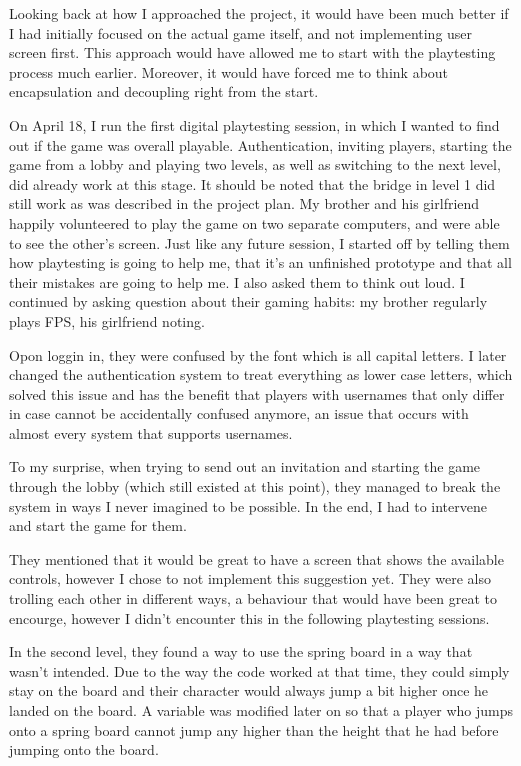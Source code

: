 \documentclass{article}
\begin{document}
Looking back at how I approached the project, it would have been much better if I had initially focused on the actual game itself, and not implementing user screen first. This approach would have allowed me to start with the playtesting process much earlier. Moreover, it would have forced me to think about encapsulation and decoupling right from the start. 

\bigskip
On April 18, I run the first digital playtesting session, in which I wanted to find out if the game was overall playable. Authentication, inviting players, starting the game from a lobby and playing two levels, as well as switching to the next level, did already work at this stage. It should be noted that the bridge in level 1 did still work as was described in the project plan. My brother and his girlfriend happily volunteered to play the game on two separate computers, and were able to see the other's screen. Just like any future session, I started off by telling them how playtesting is going to help me, that it's an unfinished prototype and that all their mistakes are going to help me. I also asked them to think out loud.
I continued by asking question about their gaming habits: my brother regularly plays FPS, his girlfriend noting. 

Opon loggin in, they were confused by the font which is all capital letters. I later changed the authentication system to treat everything as lower case letters, which solved this issue and has the benefit that players with usernames that only differ in case cannot be accidentally confused anymore, an issue that occurs with almost every system that supports usernames.

To my surprise, when trying to send out an invitation and starting the game through the lobby (which still existed at this point), they managed to break the system in ways I never imagined to be possible. In the end, I had to intervene and start the game for them.

They mentioned that it would be great to have a screen that shows the available controls, however I chose to not implement this suggestion yet.
They were also trolling each other in different ways, a behaviour that would have been great to encourge, however I didn't encounter this in the following playtesting sessions.

In the second level, they found a way to use the spring board in a way that wasn't intended. Due to the way the code worked at that time, they could simply stay on the board and their character would always jump a bit higher once he landed on the board. A variable was modified later on so that a player who jumps onto a spring board cannot jump any higher than the height that he had before jumping onto the board.
\end{document}
